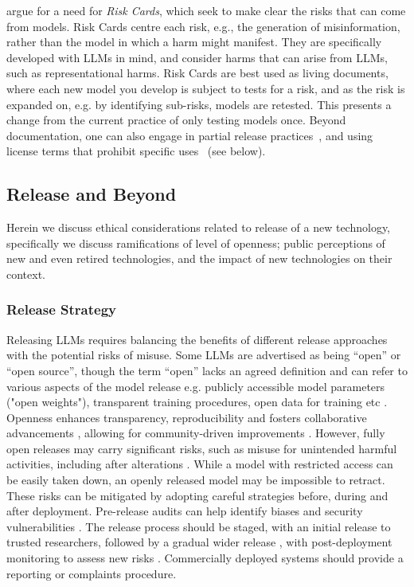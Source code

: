 \citet{derczynski_assessing_2023} argue for a need for \textit{Risk Cards}, which seek to make clear the risks that can come from models. Risk Cards centre each risk, e.g., the generation of misinformation, rather than the model in which a harm might manifest. They are specifically developed with LLMs in mind, and consider harms that can arise from LLMs, such as representational harms. Risk Cards are best used as living documents, where each new model you develop is subject to tests for a risk, and as the risk is expanded on, e.g. by identifying sub-risks, models are retested. This presents a change from the current practice of only testing models once.
Beyond documentation, one can also engage in partial release practices~\cite{kaffee_thorny_2023,solaiman_release_2019}, and using license terms that prohibit specific uses~\cite{McDuff_Standardization_2024,jernite_data_2022} (see below). 


\subsection{Release and Beyond}
Herein we discuss ethical considerations related to release of a new technology, specifically we discuss ramifications of level of openness; public perceptions of new and even retired technologies, and the impact of new technologies on their context.

\subsubsection{Release Strategy}
Releasing LLMs requires balancing the benefits of different release approaches with the potential risks of misuse. Some LLMs are advertised as being ``open'' or ``open source'', though the term ``open'' lacks an agreed definition and can refer to various aspects of the model release e.g. publicly accessible model parameters ("open weights"), transparent training procedures, open data for training etc \cite{solaiman_release_2019,widder_open_2023, groeneveld_olmo_2024}.
Openness enhances transparency, reproducibility and fosters collaborative advancements \cite{widder_open_2023,spirling_why_2023}, allowing for community-driven improvements \cite{madnani_building_2017}.
However, fully open releases may carry significant risks, such as misuse for unintended harmful activities, including after alterations \cite{arditi2024refusal}. While a model with restricted access can be easily taken down, an openly released model may be impossible to retract.
These risks can be mitigated by adopting careful strategies before, during and after deployment. Pre-release audits can help identify biases and security vulnerabilities \cite{madnani_building_2017,ji2023ai}. The release process should be staged, with an initial release to trusted researchers, followed by a gradual wider release \cite{solaiman_release_2019}, with post-deployment monitoring to assess new risks \cite{anderljung2023frontier}. Commercially deployed systems should provide a reporting or complaints procedure. 

